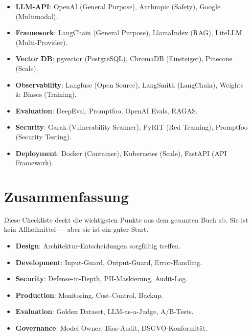 \begin{itemize}[leftmargin=*]
     \item \textbf{LLM-API}\hspace{0pt}: OpenAI (General Purpose), Anthropic (Safety), Google (Multimodal).
     \item \textbf{Framework}\hspace{0pt}: LangChain (General Purpose), LlamaIndex (RAG), LiteLLM (Multi-Provider).
     \item \textbf{Vector DB}\hspace{0pt}: pgvector (PostgreSQL), ChromaDB (Einsteiger), Pinecone (Scale).
     \item \textbf{Observability}\hspace{0pt}: Langfuse (Open Source), LangSmith (LangChain), Weights \& Biases (Training).
     \item \textbf{Evaluation}\hspace{0pt}: DeepEval, Promptfoo, OpenAI Evals, RAGAS.
     \item \textbf{Security}\hspace{0pt}: Garak (Vulnerability Scanner), PyRIT (Red Teaming), Promptfoo (Security Testing).
     \item \textbf{Deployment}\hspace{0pt}: Docker (Container), Kubernetes (Scale), FastAPI (API Framework).
\end{itemize}

\section{Zusammenfassung}

Diese Checkliste deckt die wichtigsten Punkte aus dem gesamten Buch ab. Sie ist kein Allheilmittel --- aber sie ist ein guter Start.

\begin{itemize}[leftmargin=*]
     \item \textbf{Design}\hspace{0pt}: Architektur-Entscheidungen sorgfältig treffen.
     \item \textbf{Development}\hspace{0pt}: Input-Guard, Output-Guard, Error-Handling.
     \item \textbf{Security}\hspace{0pt}: Defense-in-Depth, PII-Maskierung, Audit-Log.
     \item \textbf{Production}\hspace{0pt}: Monitoring, Cost-Control, Backup.
     \item \textbf{Evaluation}\hspace{0pt}: Golden Dataset, LLM-as-a-Judge, A/B-Tests.
     \item \textbf{Governance}\hspace{0pt}: Model Owner, Bias-Audit, DSGVO-Konformität.
\end{itemize}

